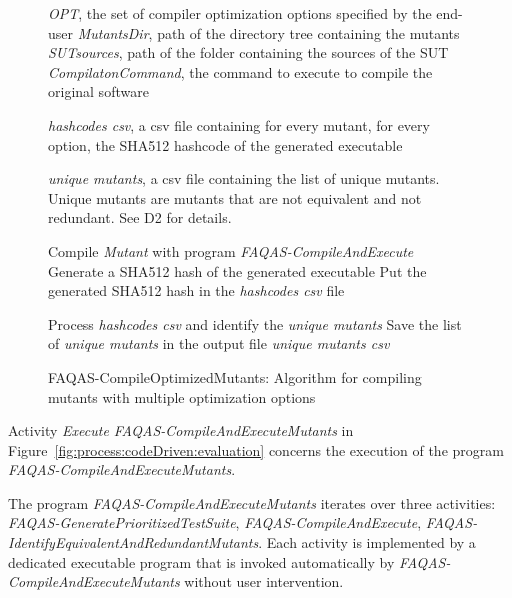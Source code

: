 \begin{figure}[h]
\begin{algorithmic}[1]

\scriptsize


\Require \emph{OPT}, the set of compiler optimization options specified by the end-user
\Require \emph{MutantsDir}, path of the directory tree containing the mutants
\Require \emph{SUTsources}, path of the folder containing the sources of the SUT
\Require \emph{CompilatonCommand}, the command to execute to compile the original software

\Ensure \emph{hashcodes csv}, a csv file containing for every mutant, for every option, the SHA512 hashcode of the generated executable

\Ensure \emph{unique mutants}, a csv file containing the list of unique mutants. Unique mutants are mutants that are not equivalent and not redundant. See D2 for details.

\State Compile \emph{Mutant} with program \emph{FAQAS-CompileAndExecute}
\State Generate a SHA512 hash of the generated executable
\State Put the generated SHA512 hash in the \emph{hashcodes csv} file
\EndFor
\EndFor

\State Process \emph{hashcodes csv} and identify the \emph{unique mutants}
\State Save the list of \emph{unique mutants} in the output file \emph{unique mutants csv} 

\end{algorithmic}
\caption{FAQAS-CompileOptimizedMutants: Algorithm for compiling mutants with multiple optimization options}
\label{alg:CompileOptimizedMutants}
\end{figure}




\RQ{} Activity \emph{Execute FAQAS-CompileAndExecuteMutants} in Figure~\ref{fig:process:codeDriven:evaluation} concerns the execution of the program \emph{FAQAS-CompileAndExecuteMutants}.

\RQ{} The program \emph{FAQAS-CompileAndExecuteMutants} iterates over three activities: \emph{FAQAS-GeneratePrioritizedTestSuite}, \emph{FAQAS-CompileAndExecute}, \emph{FAQAS-IdentifyEquivalentAndRedundantMutants}. Each activity is implemented by a dedicated executable program that is invoked automatically by \emph{FAQAS-CompileAndExecuteMutants} without user intervention.

